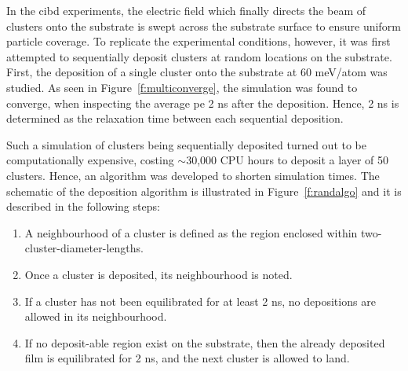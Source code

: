 In the \gls{cibd} experiments, the electric field which finally directs the beam of clusters onto the substrate is swept across the substrate surface to ensure uniform particle coverage. To replicate the experimental conditions, however, it was first attempted to sequentially deposit clusters at random locations on the substrate. First, the deposition of a single cluster onto the substrate at 60 meV/atom was studied. As seen in Figure~\ref{f:multiconverge}, the simulation was found to converge, when inspecting the average \gls{pe} 2 ns after the deposition. Hence, 2 ns is determined as the relaxation time between each sequential deposition. \par Such a simulation of clusters being sequentially deposited turned out to be computationally expensive, costing $\sim$30,000 CPU hours to deposit a layer of 50 clusters. Hence, an algorithm was developed to shorten simulation times. The schematic of the deposition algorithm is illustrated in Figure~\ref{f:randalgo} and it is described in the following steps:

\begin{enumerate}[noitemsep]
	\item A neighbourhood of a cluster is defined as the region enclosed within two-cluster-diameter-lengths.
	\item Once a cluster is deposited, its neighbourhood is noted.
	\item If a cluster has not been equilibrated for at least 2 ns, no depositions are allowed in its neighbourhood.
	\item If no deposit-able region exist on the substrate, then the already deposited film is equilibrated for 2 ns, and the next cluster is allowed to land.
\end{enumerate}


